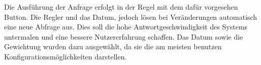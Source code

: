 Die Ausführung der Anfrage erfolgt in der Regel mit dem dafür vorgesehen Button. Die Regler und das Datum, jedoch lösen bei Veränderungen automatisch eine neue Abfrage aus. Dies soll die hohe Antwortgeschwindigkeit des Systems untermalen und eine bessere Nutzererfahrung schaffen. Das Datum sowie die Gewichtung wurden dazu ausgewählt, da sie die am meisten benutzen Konfigurationsmöglichkeiten darstellen.

